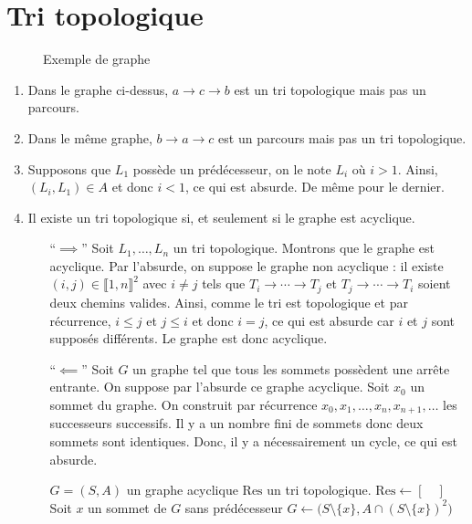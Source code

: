 \section{Tri topologique}

\begin{figure}[H]
	\centering
	\caption{Exemple de graphe}
\end{figure}

\begin{enumerate}
	\item Dans le graphe ci-dessus, $a \to c \to b$\/ est un tri topologique mais pas un parcours.
	\item Dans le même graphe, $b \to a \to c$\/ est un parcours mais pas un tri topologique.
	\item Supposons que $L_1$\/ possède un prédécesseur, on le note $L_i$\/ où $i > 1$. Ainsi, $(L_i, L_1) \in A$\/ et donc $i < 1$, ce qui est absurde. De même pour le dernier.
	\item Il existe un tri topologique si, et seulement si le graphe est acyclique.
		\begin{itemize}
			\item[``$\implies$'']
				Soit $L_1,\ldots,L_n$\/ un tri topologique. Montrons que le graphe est acyclique.
				Par l'absurde, on suppose le graphe non acyclique : il existe $(i,j) \in \llbracket 1,n \rrbracket^2$\/ avec $i \neq j$\/ tels que $T_i \to \cdots \to T_j$\/ et $T_j \to \cdots \to T_i$ soient deux chemins valides. Ainsi, comme le tri est topologique et par récurrence, $i \le j$\/ et $j \le i$\/ et donc $i = j$, ce qui est absurde car $i$\/ et $j$\/ sont supposés différents. Le graphe est donc acyclique.
			\item[``$\impliedby$'']
				Soit $G$\/ un graphe tel que tous les sommets possèdent une arrête entrante. On suppose par l'absurde ce graphe acyclique.
				Soit $x_0$\/ un sommet du graphe.
				On construit par récurrence $x_0,x_1,\ldots,x_n,x_{n+1},\ldots$ les successeurs successifs. Il y a un nombre fini de sommets donc deux sommets sont identiques. Donc, il y a nécessairement un cycle, ce qui est absurde.
				\begin{algorithm}[H]
					\centering
					\begin{algorithmic}[1]
						\Entree $G = (S, A)$\/ un graphe acyclique
						\Sortie $\mathrm{Res}$\/ un tri topologique.
						\State $\mathrm{Res} \gets [\quad]$\/
							\State Soit $x$\/ un sommet de $G$\/ sans prédécesseur
							\State $G \gets \big(S \setminus \{x\}, A \cap (S \setminus \{x\})^2\big)$\/ 

\end{algorithmic}
\end{algorithm}
\end{itemize}
\end{enumerate}
